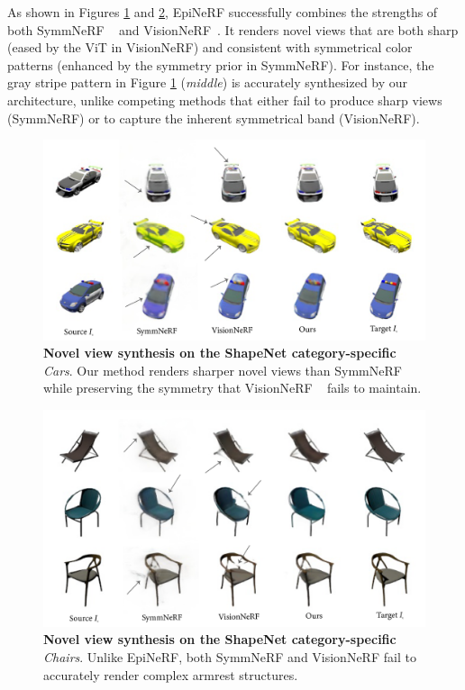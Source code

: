 As shown in Figures \ref{fig:exp-srn-cars} and \ref{fig:exp-srn-chairs}, EpiNeRF successfully combines the strengths of both SymmNeRF ~\citep{li2022symmnerf} and VisionNeRF~\citep{lin2023vision}. It renders novel views that are both sharp (eased by the \ac{ViT} in VisionNeRF) and consistent with symmetrical color patterns (enhanced by the symmetry prior in SymmNeRF). For instance, the gray stripe pattern in Figure \ref{fig:exp-srn-cars} (\textit{middle}) is  accurately synthesized by our architecture, unlike competing methods that either fail to produce sharp views (SymmNeRF) or to capture the inherent symmetrical band (VisionNeRF). 

\begin{figure}[h!]
    \begin{center}
  \includegraphics[width=\linewidth]{images/epinerf/cars_BMVC.png}
  \end{center}
  \caption{\textbf{Novel view synthesis on the ShapeNet category-specific} \textit{Cars}. Our method renders sharper novel views than SymmNeRF ~\citep{li2022symmnerf} while preserving the symmetry that VisionNeRF ~\citep{lin2023vision} fails to maintain.}
  \label{fig:exp-srn-cars}
\end{figure}

\begin{figure}[h!]
    \begin{center}
  \includegraphics[width=\linewidth]{images/epinerf/chairs_BMVC.png}
  \end{center}
  \caption{\textbf{Novel view synthesis on the ShapeNet category-specific} \textit{Chairs}. Unlike EpiNeRF, both SymmNeRF \citep{li2022symmnerf} and VisionNeRF \citep{lin2023vision} fail to accurately render complex armrest structures.}
  \label{fig:exp-srn-chairs}
\end{figure}

